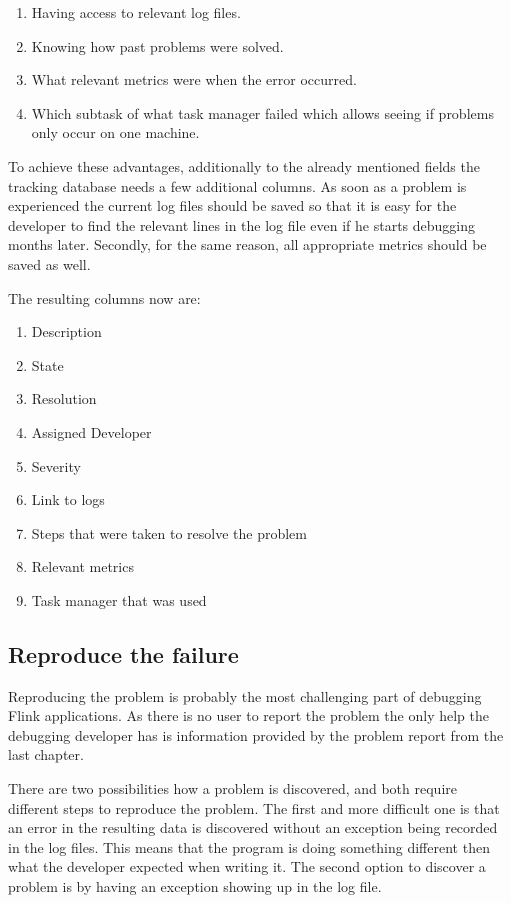\begin{enumerate}
  \item Having access to relevant log files.
  \item Knowing how past problems were solved.
  \item What relevant metrics were when the error occurred.
  \item Which subtask of what task manager failed which allows seeing if problems only occur on one machine.
\end{enumerate}

To achieve these advantages, additionally to the already mentioned fields the tracking database needs a few additional columns. As soon as a problem is experienced the current log files should be saved so that it is easy for the developer to find the relevant lines in the log file even if he starts debugging months later. Secondly, for the same reason, all appropriate metrics should be saved as well.

The resulting columns now are:

\begin{enumerate}
  \item Description
  \item State
  \item Resolution
  \item Assigned Developer
  \item Severity
  \item Link to logs
  \item Steps that were taken to resolve the problem
  \item Relevant metrics
  \item Task manager that was used
\end{enumerate}

\subsection{Reproduce the failure}
Reproducing the problem is probably the most challenging part of debugging Flink applications. As there is no user to report the problem the only help the debugging developer has is information provided by the problem report from the last chapter.

There are two possibilities how a problem is discovered, and both require different steps to reproduce the problem. The first and more difficult one is that an error in the resulting data is discovered without an exception being recorded in the log files. This means that the program is doing something different then what the developer expected when writing it. The second option to discover a problem is by having an exception showing up in the log file.

